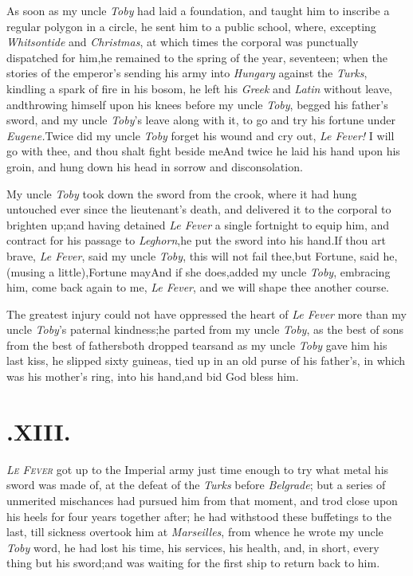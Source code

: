 \documentclass{article}
\begin{document}
As soon as my uncle \textit{Toby} had laid a foundation, and
taught him to inscribe a regular polygon in a circle, he sent him
to a public school, where, excepting \textit{Whitsontide} and
\textit{Christmas}, at which times the corporal was punctually
dispatched for him,\tsk he remained to the spring of the year,
seventeen; when the stories of the emperor’s sending his army
into \textit{Hungary} against the \textit{Turks}, kindling a spark of
fire in his bosom, he left his \textit{Greek} and \textit{Latin}
without leave, and\pb throwing himself upon his knees before my uncle
\textit{Toby}, begged his father’s sword, and my uncle
\textit{Toby}’s leave along with it, to go and try his fortune
under \textit{Eugene.}\tsk Twice did my uncle \textit{Toby} forget
his wound and cry out, \textit{Le Fever!} I will go with thee, and
thou shalt fight beside me\tsh And twice he laid his hand
upon his groin, and hung down his head in sorrow and
disconsolation.\tsh

My uncle \textit{Toby} took down the sword from the
crook, where it had hung untouched ever since the
lieutenant’s death, and delivered it to the corporal to
brighten up;\tsh and having detained \textit{Le Fever} a
single fortnight to equip him, and contract for his passage to
\textit{Leghorn},\break\tsk he put the sword into his
hand.\tsh If thou art brave, \textit{Le Fever}, said my
uncle \textit{Toby}, this will not fail thee,\tsh\pb but
Fortune, said he, (musing a little),\break\tsh Fortune
may\tsh And if she does,\break\tsk added my uncle \textit{Toby},
embracing him, come back again to me, \textit{Le Fever}, and we will
shape thee another course.

The greatest injury could not have oppressed the heart of \textit{Le
Fever} more than my uncle \textit{Toby}’s paternal
kindness;\tsh he parted from my uncle \textit{Toby}, as the
best of sons from the best of fathers\tsh both dropped
tears\tsh and as my uncle \textit{Toby} gave him his last
kiss, he slipped sixty guineas, tied up in an old purse of his
father’s, in which was his mother’s ring, into his
hand,\tsk and bid God bless him.

\newpage
\section{.\enspace XIII.}

\lettrine{\itshape L}{\itshape e Fever} got up to the
Imperial army just time enough to try what metal his sword was made
of, at the defeat of the \textit{Turks} before \textit{Belgrade}; but a
series of unmerited mischances had pursued him from that moment,
and trod close upon his heels for four years together after; he had
withstood these buffetings to the last, till sickness overtook him
at \textit{Marseilles}, from whence he wrote my uncle \textit{Toby}
word, he had lost his time, his services, his health, and, in
short, every thing but his sword;\tsh and was waiting for
the first ship to return back to him.
\end{document}
